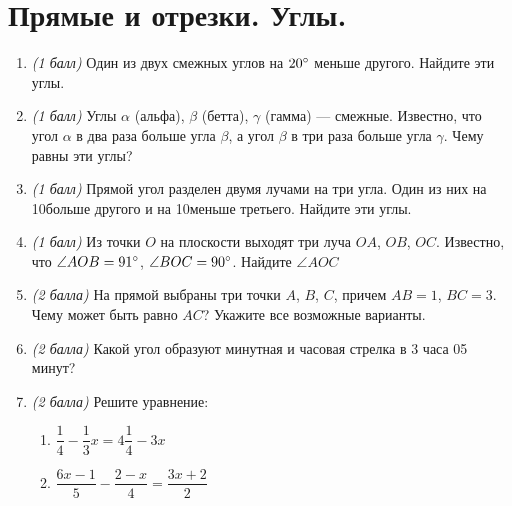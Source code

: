 \documentclass[12pt, a4paper]{article}
\begin{document}
		

\section*{Прямые и отрезки. Углы.}
\begin{enumerate}
	\item \textit{(1 балл)} Один из двух смежных углов на $20\degree$ меньше другого. Найдите эти углы.
	\item \textit{(1 балл)} Углы $\alpha$ (альфа), $\beta$ (бетта), $\gamma$ (гамма) — смежные. Известно, что угол $\alpha$ в два раза больше угла $\beta$, а угол $\beta$ в три раза больше угла $\gamma$. Чему равны эти углы?
	\item \textit{(1 балл)} Прямой угол разделен двумя лучами на три угла. Один из них на 10\degree больше другого и на 10\degree меньше третьего. Найдите эти углы.
	\item \textit{(1 балл)} Из точки $O$ на плоскости выходят три луча $OA$, $OB$, $OC$. Известно, что $\angle AOB=91\degree$, $\angle BOC=90\degree$. Найдите $\angle AOC$
	\item \textit{(2 балла)} На прямой выбраны три точки $A$, $B$, $C$, причем $AB=1$, $BC=3$. Чему может быть равно $AC$? Укажите все возможные варианты.
	\item \textit{(2 балла)} Какой угол образуют минутная и часовая стрелка в 3 часа 05 минут?
	\item \textit{(2 балла)} Решите уравнение:
	\begin{enumerate}[label=\asbuk*)]
		\item $\dfrac{1}{4} - \dfrac{1}{3}x = 4\dfrac{1}{4} - 3x$
		\item $\dfrac{6x -1}{5} - \dfrac{2-x}{4} = \dfrac{3x+2}{2}$
	\end{enumerate}
\end{enumerate}
\end{document}
